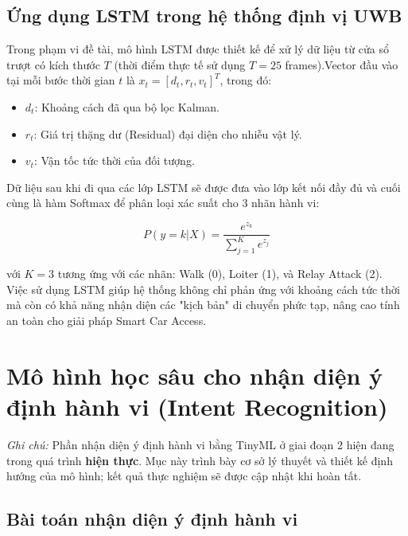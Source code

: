 \subsection{Ứng dụng LSTM trong hệ thống định vị UWB}Trong phạm vi đề tài, mô hình LSTM được thiết kế để xử lý dữ liệu từ cửa sổ trượt có kích thước $T$ (thời điểm thực tế sử dụng $T=25$ frames).Vector đầu vào tại mỗi bước thời gian $t$ là $x_t = [d_t, r_t, v_t]^T$, trong đó:

\begin{itemize}
\item $d_t$: Khoảng cách đã qua bộ lọc Kalman.
\item $r_t$: Giá trị thặng dư (Residual) đại diện cho nhiễu vật lý.
\item $v_t$: Vận tốc tức thời của đối tượng.
\end{itemize}


Dữ liệu sau khi đi qua các lớp LSTM sẽ được đưa vào lớp kết nối đầy đủ và cuối cùng là hàm Softmax để phân loại xác suất cho 3 nhãn hành vi:

\begin{equation}P(y=k|X) = \frac{e^{z_k}}{\sum_{j=1}^{K} e^{z_j}}\end{equation}

với $K=3$ tương ứng với các nhãn: Walk (0), Loiter (1), và Relay Attack (2). Việc sử dụng LSTM giúp hệ thống không chỉ phản ứng với khoảng cách tức thời mà còn có khả năng nhận diện các "kịch bản" di chuyển phức tạp, nâng cao tính an toàn cho giải pháp Smart Car Access.
\fi

\section{Mô hình học sâu cho nhận diện ý định hành vi (Intent Recognition)}

\textit{Ghi chú:} Phần nhận diện ý định hành vi bằng TinyML ở giai đoạn 2 hiện đang trong quá trình \textbf{hiện thực}. Mục này trình bày cơ sở lý thuyết và thiết kế định hướng của mô hình; kết quả thực nghiệm sẽ được cập nhật khi hoàn tất.

\subsection{Bài toán nhận diện ý định hành vi}

